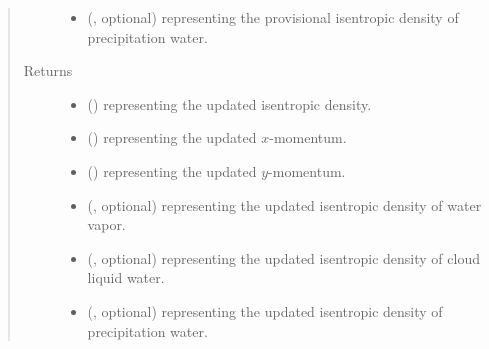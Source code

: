 \documentclass[letterpaper,10pt,english]{sphinxmanual}
\begin{document}
\begin{fulllineitems}
\begin{fulllineitems}
\begin{quote}
\begin{description}
\begin{itemize}
\item {} 
 (, optional) \textendash{}  representing the provisional isentropic density of precipitation water.

\end{itemize}

\item[{Returns}] \leavevmode
\begin{itemize}
\item {} 
 () \textendash{}  representing the updated isentropic density.

\item {} 
 () \textendash{}  representing the updated \(x\)-momentum.

\item {} 
 () \textendash{}  representing the updated \(y\)-momentum.

\item {} 
 (, optional) \textendash{}  representing the updated isentropic density of water vapor.

\item {} 
 (, optional) \textendash{}  representing the updated isentropic density of cloud liquid water.

\item {} 
 (, optional) \textendash{}  representing the updated isentropic density of precipitation water.

\end{itemize}


\end{description}\end{quote}

\end{fulllineitems}



\end{fulllineitems}
\end{document}
